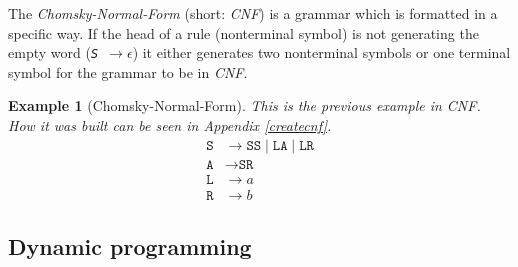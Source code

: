 \documentclass[a4paper, 11pt]{article}
\newtheorem*{example*}{Example}
\begin{document}
The \textit{Chomsky-Normal-Form} (short: \textit{CNF}) is a grammar which is formatted in a specific way. If the head of a rule (nonterminal symbol) is not generating the empty word (\textit{\texttt{S $\rightarrow \epsilon$}}) it either generates two nonterminal symbols or one terminal symbol for the grammar to be in \textit{CNF}.
\cite{CNF}

\begin{example*}[Chomsky-Normal-Form]
This is the previous example in CNF. How it was built can be seen in Appendix \ref{createcnf}.
\begin{align*}
\texttt{S} & \rightarrow \texttt{SS} \mid  \texttt{LA} \mid \texttt{LR} \\
\texttt{A} & \rightarrow \texttt{SR} \\
\texttt{L} & \rightarrow a \\
\texttt{R} & \rightarrow b
\end{align*}
\end{example*}



\subsection{Dynamic programming}
\label{dp}
\end{document}
